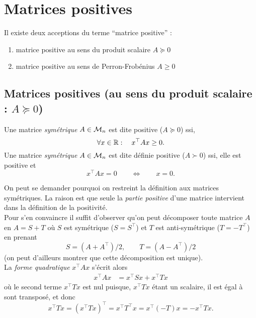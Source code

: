 \section{Matrices positives} \label{sec:LinAlg-Pos}

\remark Il existe deux acceptions du terme ``matrice positive'' :
\begin{enumerate}[$\bullet$]
  \item matrice positive au sens du produit scalaire $A \succcurlyeq 0$
  \item matrice positive au sens de Perron-Frobénius $A \geq 0$
\end{enumerate}


\subsection{Matrices positives (au sens du produit scalaire : $A \succcurlyeq 0$)} 

\begin{definition*} 
  Une matrice {\em symétrique} $A \in \mathcal{M}_n$ est dite positive ($A \succcurlyeq 0$) ssi, 
  $$
  \forall x \in \mathbb{R}: \quad x^\top A x \geq 0.
  $$
  Une matrice {\em symétrique} $A \in \mathcal{M}_n$ est dite définie positive ($A \succ 0$) ssi, elle est positive et 
  $$
  x^\top A x = 0 \qquad \Leftrightarrow \qquad x = 0.
  $$
\end{definition*}

\remark
On peut se demander pourquoi on restreint la définition aux matrices symétriques. La raison est que seule la {\em partie positive} d'une matrice intervient dans la définition de la positivité. \\
Pour s'en convaincre il suffit d'observer qu'on peut décomposer toute matrice $A$  en $A = S + T$ où $S$ est symétrique ($S = S^\top$) et $T$ est anti-symétrique ($T = -T^\top$) en prenant
$$
S = (A + A^\top) / 2, \qquad T = (A - A^\top) / 2
$$
(on peut d'ailleurs montrer que cette décomposition est unique). \\
La {\em forme quadratique} $x^\top A x$ s'écrit alors
\begin{align*}
  x^\top A x 
  & = x^\top S x + x^\top T x 
\end{align*}
où le second terme $x^\top T x$ est nul puisque, $x^\top T x$ étant un scalaire, il est égal à sont transposé, et donc
$$
x^\top T x = (x^\top T x)^\top = x^\top T^\top x = x^\top (- T) x = - x^\top T x.
$$


